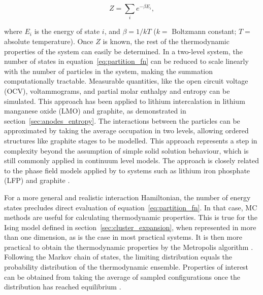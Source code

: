 \documentclass[../main.tex]{subfiles}
\begin{document}
\begin{equation}
        Z = \sum_{i}e^{-\beta E_{i}},
        \label{eq:partition_fn}
\end{equation}

where $E_{i}$ is the energy of state $i$, and $\beta = 1/kT$ ($k =$ Boltzmann constant; $T=$ absolute temperature). Once $Z$ is known, the rest of the thermodynamic properties of the system can easily be determined.\cite{Mercer2019,Leiva2017b,schlueter_quantifying_2018} In a two-level system,\cite{Leiva2017b} the number of states in equation~\ref{eq:partition_fn} can be reduced to scale linearly with the number of particles in the system, making the summation computationally tractable.\cite{Mercer2019,Leiva2017b,schlueter_quantifying_2018} Measurable quantities, like the open circuit voltage (OCV), voltammograms, and partial molar enthalpy and entropy can be simulated.\cite{schlueter_quantifying_2018,Leiva2017b,Mercer2019} This approach has been applied to lithium intercalation in lithium manganese oxide (LMO) \cite{schlueter_quantifying_2018} and graphite,\cite{Mercer2019,Leiva2017b} as demonstrated in section~\ref{sec:anodes_entropy}. The interactions between the particles can be approximated by taking the average occupation in two levels, allowing ordered structures like graphite stages to be modelled. This approach represents a step in complexity beyond the assumption of simple solid solution behaviour, which is still commonly applied in continuum level models.\cite{HAFTBARADARAN2011361} The approach is closely related to the phase field models applied by \citeauthor{Bazant2017} to systems such as lithium iron phosphate (LFP) and graphite \cite{Bazant2017,guo2016,peng2011}.

For a more general and realistic interaction Hamiltonian, the number of energy states precludes direct evaluation of equation~\ref{eq:partition_fn}. In that case, MC methods are useful for calculating thermodynamic properties. This is true for the Ising model defined in section~\ref{sec:cluster_expansion}, when represented in more than one dimension, as is the case in most practical systems.  It is then more practical to obtain the thermodynamic properties by the Metropolis algorithm \cite{Metropolis1953}. Following the Markov chain of states, the limiting distribution equals the probability distribution of the thermodynamic ensemble. Properties of interest can be obtained from taking the average of sampled configurations once the distribution has reached equilibrium \cite{oviedo2015underpotential}.
\end{document}
